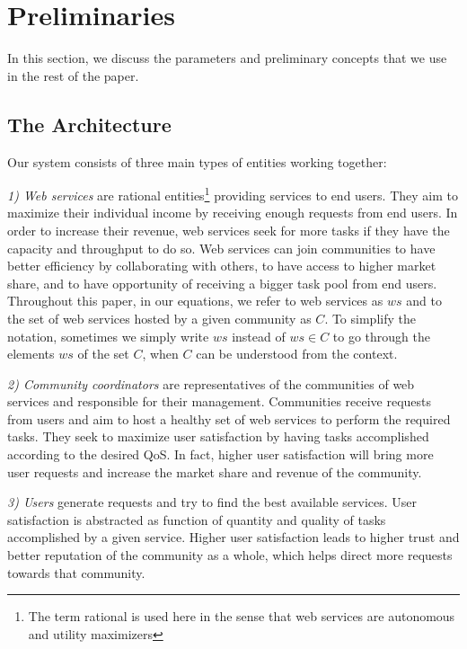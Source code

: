 \documentclass[10pt,journal,cspaper,compsoc]{IEEEtran}
\begin{document}



\section{Preliminaries}\label{s:preliminaries}

In this section, we discuss the parameters and preliminary
concepts that we use in the rest of the paper.

\subsection{The Architecture}

Our system consists of three main types of entities working
together:

\emph{1) Web services} are rational entities\footnote{The term
rational is used here in the sense that web services are
autonomous and utility maximizers} providing services to end
users. They aim to maximize their individual income by receiving
enough requests from end users. In order to increase their
revenue, web services seek for more tasks if they have the
capacity and throughput to do so. Web services can join
communities to have better efficiency by collaborating with
others, to have access to higher market share, and to have
opportunity of receiving a bigger task pool from end users.
Throughout this paper, in our equations, we refer to web services
as $ws$ and to the set of web services hosted by a given community
as $C$. To simplify the notation, sometimes we simply write $ws$
instead of $ws \in C$ to go through the elements $ws$ of the set
$C$, when $C$ can be understood from the context.

\emph{2) Community coordinators} are
representatives of the communities of web services and responsible
for their management. Communities receive requests from users and
aim to host a healthy set of web services to perform the required
tasks. They seek to maximize user satisfaction by having tasks
accomplished according to the desired QoS. In fact, higher user
satisfaction will bring more user requests and increase the market
share and revenue of the community.

\emph{3) Users} generate requests and try to find the best
available services. User satisfaction is abstracted as function of
quantity and quality of tasks accomplished by a given service.
Higher user satisfaction leads to higher trust and better
reputation of the community as a whole, which helps direct more
requests towards that community.
\end{document}
